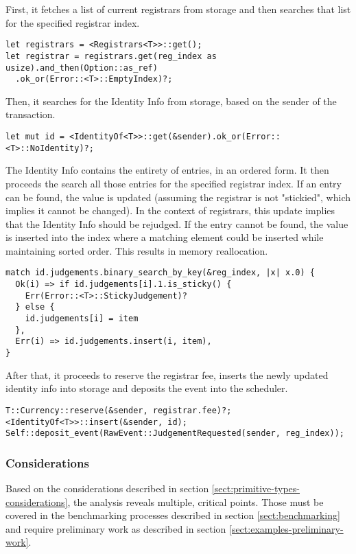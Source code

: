 \documentclass[11pt,a4paper]{article}
\begin{document}
First, it fetches a list of current registrars from storage and then searches that list for the specified
registrar index.

\begin{verbatim}
let registrars = <Registrars<T>>::get();
let registrar = registrars.get(reg_index as usize).and_then(Option::as_ref)
  .ok_or(Error::<T>::EmptyIndex)?;
\end{verbatim}

Then, it searches for the Identity Info from storage, based on the sender of the transaction.

\begin{verbatim}
let mut id = <IdentityOf<T>>::get(&sender).ok_or(Error::<T>::NoIdentity)?;
\end{verbatim}

The Identity Info contains the entirety of entries, in an ordered form. It then proceeds the search all
those entries for the specified registrar index. If an entry can be found, the value is updated
(assuming the registrar is not "stickied", which implies it cannot be changed). In the context of registrars,
this update implies that the Identity Info should be rejudged. If the entry cannot 
be found, the value is inserted into the index where a matching element could be inserted while maintaining
sorted order. This results in memory reallocation.

\begin{verbatim}
match id.judgements.binary_search_by_key(&reg_index, |x| x.0) {
  Ok(i) => if id.judgements[i].1.is_sticky() {
    Err(Error::<T>::StickyJudgement)?
  } else {
    id.judgements[i] = item
  },
  Err(i) => id.judgements.insert(i, item),
}
\end{verbatim}

After that, it proceeds to reserve the registrar fee, inserts the newly updated identity info into storage
and deposits the event into the scheduler.

\begin{verbatim}
T::Currency::reserve(&sender, registrar.fee)?;
<IdentityOf<T>>::insert(&sender, id);
Self::deposit_event(RawEvent::JudgementRequested(sender, reg_index));
\end{verbatim}

\subsubsection*{Considerations}

Based on the considerations described in section \ref{sect:primitive-types-considerations},
the analysis reveals multiple, critical points. Those must be covered in the benchmarking
processes described in section \ref{sect:benchmarking} and require preliminary work as
described in section \ref{sect:examples-preliminary-work}.
\newline
\end{document}
